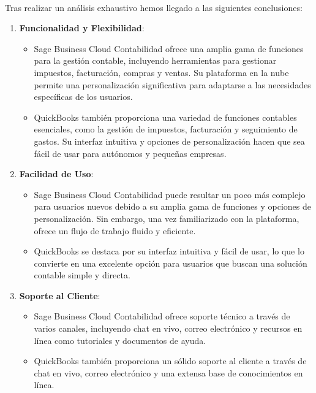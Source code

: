 \paragraph{}
Tras realizar un análisis exhaustivo hemos llegado a las siguientes conclusiones: 
\begin{enumerate}

\item \textbf{Funcionalidad y Flexibilidad}:
   \begin{itemize}
       \item Sage Business Cloud Contabilidad ofrece una amplia gama de funciones para la gestión contable, incluyendo herramientas para gestionar impuestos, facturación, compras y ventas. Su plataforma en la nube permite una personalización significativa para adaptarse a las necesidades específicas de los usuarios.
       \item QuickBooks también proporciona una variedad de funciones contables esenciales, como la gestión de impuestos, facturación y seguimiento de gastos. Su interfaz intuitiva y opciones de personalización hacen que sea fácil de usar para autónomos y pequeñas empresas.
   \end{itemize}

\item \textbf{Facilidad de Uso}:
   \begin{itemize}
       \item Sage Business Cloud Contabilidad puede resultar un poco más complejo para usuarios nuevos debido a su amplia gama de funciones y opciones de personalización. Sin embargo, una vez familiarizado con la plataforma, ofrece un flujo de trabajo fluido y eficiente.
       \item QuickBooks se destaca por su interfaz intuitiva y fácil de usar, lo que lo convierte en una excelente opción para usuarios que buscan una solución contable simple y directa.
   \end{itemize}

\item \textbf{Soporte al Cliente}:
   \begin{itemize}
       \item Sage Business Cloud Contabilidad ofrece soporte técnico a través de varios canales, incluyendo chat en vivo, correo electrónico y recursos en línea como tutoriales y documentos de ayuda.
       \item QuickBooks también proporciona un sólido soporte al cliente a través de chat en vivo, correo electrónico y una extensa base de conocimientos en línea.
   \end{itemize}


\end{enumerate}
